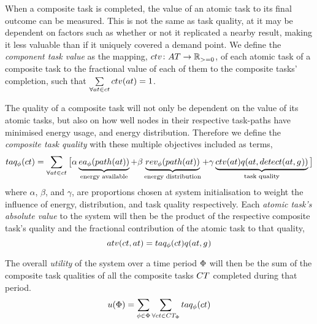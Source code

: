 When a composite task is completed, the value of an atomic task to its final outcome can be measured. This is not the same as task quality, at it may be dependent on factors such as whether or not it replicated a nearby result, making it less valuable than if it uniquely covered a demand point. We define the \textit{component task value} as the mapping, $\formalComponentTaskValue{}{}$,  of each atomic task of a composite task to the fractional value of each of them to the composite tasks' completion, such that $\sum\limits_{\forall \varAtomicTask{}{} \in \varCompositeTask{}{}} \functionComponentTaskValue{}{} = 1$.

The quality of a composite task will not only be dependent on the value of its atomic tasks, but also on how well nodes in their respective task-paths have minimised energy usage, and energy distribution. Therefore we define the \textit{composite task quality} with these multiple objectives included as terms,
\begin{equation}
	\label{eq:ctv}
	\functionCompositeTaskQuality{}{} = 
	\sum\limits_{\forall \varAtomicTask{}{} \in \varCompositeTask{}{}}
	\big\lbrack
	\alpha\underbrace{\functionEnergyAvailable{\functionTaskArc{}{}}{}}_{\text{energy available}}
	+ \beta\underbrace{\functionEnergyVariability{\functionTaskArc{}{}}{}}_{\text{energy distribution}}
	+ 
	\gamma\underbrace{
		\functionComponentTaskValue{}{}
		\functionAtomicTaskQualitySignature{\varAtomicTask{}{}}{\functionDetectorRole{}{}}
	}_{\text{task quality}}
\big\rbrack
\end{equation}
where $\alpha$, $\beta$, and $\gamma$, are proportions chosen at system initialisation to weight the influence of energy, distribution, and task quality respectively. Each \textit{atomic task's absolute value} to the system will then be the product of the respective composite task's quality and the fractional contribution of the atomic task to that quality,
\begin{equation}
	\functionTaskAbsoluteValue{}{} = 
	\functionCompositeTaskQuality{}{}
	\functionAtomicTaskQualitySignature{}{}
\end{equation}

The overall \textit{ utility} of the system over a time period $\Phi$ will then be the sum of the composite task qualities of all the composite tasks $\setCompositeTask{}{}$ completed during that period.
	\begin{equation}
		\label{eq:system_utility}
		\functionSystemUtility{}{} = \sum\limits_{\varTime{}{} \in \setTime{}{}}
		\sum\limits_{\forall \varCompositeTask{}{} \in \setCompositeTask{\setTime{}{}}{}}
		\functionCompositeTaskQuality{}{}
	\end{equation}